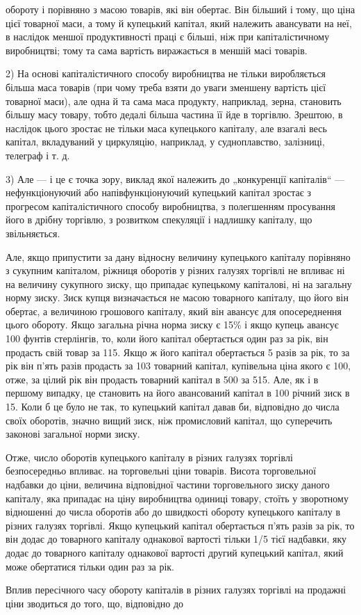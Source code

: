 обороту і порівняно з масою товарів, які він обертає. Він більший і
тому, що ціна цієї товарної маси, а тому й купецький капітал,
який належить авансувати на неї, в наслідок меншої продуктивності
праці є більші, ніж при капіталістичному виробництві;
тому та сама вартість виражається в меншій масі товарів.

2) На основі капіталістичного способу виробництва не тільки
виробляється більша маса товарів (при чому треба взяти до
уваги зменшену вартість цієї товарної маси), але одна й та сама
маса продукту, наприклад, зерна, становить більшу масу товару,
тобто дедалі більша частина її йде в торгівлю. Зрештою, в наслідок
цього зростає не тільки маса купецького капіталу, але
взагалі весь капітал, вкладуваний у циркуляцію, наприклад, у
судноплавство, залізниці, телеграф і т. д.

3) Але — і це є точка зору, виклад якої належить до „конкуренції
капіталів“ — нефункціонуючий або напівфункціонуючий
купецький капітал зростає з прогресом капіталістичного способу
виробництва, з полегшенням просування його в дрібну торгівлю,
з розвитком спекуляції і надлишку капіталу, що звільняється.

Але, якщо припустити за дану відносну величину купецького
капіталу порівняно з сукупним капіталом, ріжниця оборотів
у різних галузях торгівлі не впливає ні на величину сукупного
зиску, що припадає купецькому капіталові, ні на загальну норму
зиску. Зиск купця визначається не масою товарного капіталу,
що його він обертає, а величиною грошового капіталу, який він
авансує для опосереднення цього обороту. Якщо загальна річна
норма зиску є 15\% і якщо купець авансує 100 фунтів стерлінгів,
то, коли його капітал обертається один раз за рік, він продасть
свій товар за 115. Якщо ж його капітал обертається 5 разів за
рік, то за рік він п’ять разів продасть за 103 товарний капітал,
купівельна ціна якого є 100, отже, за цілий рік він продасть
товарний капітал в 500 за 515. Але, як і в першому випадку, це
становить на його авансований капітал в 100 річний зиск в 15.
Коли б це було не так, то купецький капітал давав би, відповідно
до числа своїх оборотів, значно вищий зиск, ніж промисловий
капітал, що суперечить законові загальної норми зиску.

Отже, число оборотів купецького капіталу в різних галузях
торгівлі безпосередньо впливає. на торговельні ціни товарів. Висота
торговельної надбавки до ціни, величина відповідної частини
торговельного зиску даного капіталу, яка припадає на ціну
виробництва одиниці товару, стоїть у зворотному відношенні
до числа оборотів або до швидкості обороту купецького
капіталу в різних галузях торгівлі. Якщо купецький капітал
обертається п’ять разів за рік, то він додає до товарного капіталу
однакової вартості тільки 1/5 тієї надбавки, яку додає до товарного
капіталу однакової вартості другий купецький капітал, який може
обертатися тільки один раз за рік.

Вплив пересічного часу обороту капіталів в різних галузях
торгівлі на продажні ціни зводиться до того, що, відповідно до
